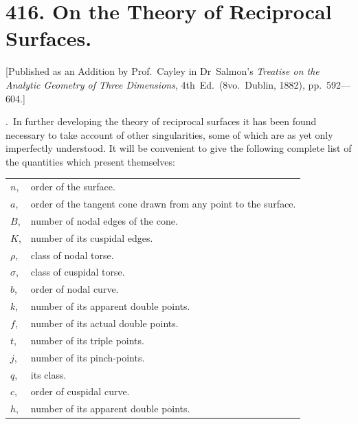 \documentclass[11pt,a4paper]{article}
\theoremstyle{plain}
\theoremstyle{definition}
\theoremstyle{remark}
\begin{document}
\section*{416. On the Theory of Reciprocal Surfaces.}

\begin{flushright}
\small[Published as an Addition by Prof.\ Cayley in Dr~Salmon's \textit{Treatise on the Analytic Geometry of Three Dimensions}, 4th~Ed.\ (8vo.\ Dublin, 1882), pp.~592---604.]
\end{flushright}

\smallskip

.\ In further developing the theory of reciprocal surfaces it has been found necessary to take account of other singularities, some of which are as yet only imperfectly understood. It will be convenient to give the following complete list of the quantities which present themselves:

\smallskip
\noindent
\begin{tabular}{@{}l@{\ }l}
$n$, & order of the surface. \\
$a$, & order of the tangent cone drawn from any point to the surface. \\
$B$, & number of nodal edges of the cone. \\
$K$, & number of its cuspidal edges. \\
$\rho$, & class of nodal torse. \\
$\sigma$, & class of cuspidal torse. \\
$b$, & order of nodal curve. \\
$k$, & number of its apparent double points. \\
$f$, & number of its actual double points. \\
$t$, & number of its triple points. \\
$j$, & number of its pinch-points. \\
$q$, & its class. \\
$c$, & order of cuspidal curve. \\
$h$, & number of its apparent double points.
\end{tabular}

\newpage
\setcounter{page}{611}
\end{document}
